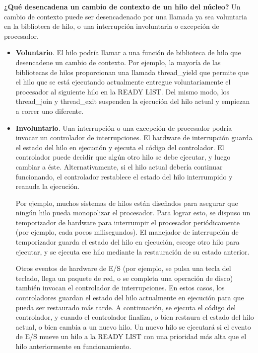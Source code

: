 \documentclass[10pt]{book}
\begin{document}
\textbf{¿Qué desencadena un cambio de contexto de un hilo del núcleo?} Un cambio de contexto puede ser desencadenado por una llamada ya sea voluntaria en la biblioteca de hilo, o una interrupción involuntaria o excepción de procesador.
\begin{itemize}
\item \textbf{Voluntario}. El hilo podría llamar a una función de biblioteca de hilo que desencadene un cambio de contexto. Por ejemplo, la mayoría de las bibliotecas de hilos proporcionan una llamada {\mf thread\_yield} que permite que el hilo que se está ejecutando actualmente entregue voluntariamente el procesador al siguiente hilo en la READY LIST. Del mismo modo, los {\mf thread\_join} y {\mf thread\_exit} suspenden la ejecución del hilo actual y empiezan a correr uno diferente.

\item \textbf{Involuntario}. Una interrupción o una excepción de procesador podría invocar un controlador de interrupciones. El hardware de interrupción guarda el estado del hilo en ejecución y ejecuta el código del controlador. El controlador puede decidir que algún otro hilo se debe ejecutar, y luego cambiar a éste. Alternativamente, si el hilo actual debería continuar funcionando, el controlador restablece el estado del hilo interrumpido y reanuda la ejecución.

Por ejemplo, muchos sistemas de hilos están diseñados para asegurar que ningún hilo pueda monopolizar el procesador. Para lograr esto, se dispuso un temporizador de hardware para interrumpir el procesador periódicamente (por ejemplo, cada pocos milisegundos). El manejador de interrupción de temporizador guarda el estado del hilo en ejecución, escoge otro hilo para ejecutar, y se ejecuta ese hilo mediante la restauración de su estado anterior.

Otros eventos de hardware de E/S (por ejemplo, se pulsa una tecla del teclado, llega un paquete de red, o se completa una operación de disco) también invocan el controlador de interrupciones. En estos casos, los controladores guardan el estado del hilo actualmente en ejecución para que pueda ser restaurado más tarde. A continuación, se ejecuta el código del controlador, y cuando el controlador finaliza, o bien restaura el estado del hilo actual, o bien cambia a un nuevo hilo. Un nuevo hilo se ejecutará si el evento de E/S mueve un hilo a la READY LIST con una prioridad más alta que el hilo anteriormente en funcionamiento.
\end{itemize}
\end{document}
